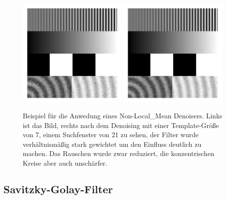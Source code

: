 \documentclass[
  12pt,
  openany]{book}
\begin{document}
\begin{figure}

{\centering \includegraphics[width=0.48\textwidth]{../imgs/geometric} \includegraphics[width=0.48\textwidth]{../imgs/nlMean_30_7_21} 

}

\caption[Beispiel für die Anwedung eines Non-Local\_Mean Denoisers.]{Beispiel für die Anwedung eines Non-Local\_Mean Denoisers. Links ist das Bild, rechts nach dem Denoising mit einer Template-Größe von 7, einem Suchfenster von 21 zu sehen, der Filter wurde verhältnismäßig stark gewichtet um den Einfluss deutlich zu machen. Das Rauschen wurde zwar reduziert, die konzentrischen Kreise aber auch unschärfer.}\label{fig:nlMeans}
\end{figure}

\hypertarget{savitzky-golay-filter}{%
\subsection{Savitzky-Golay-Filter}\label{savitzky-golay-filter}}
\end{document}
